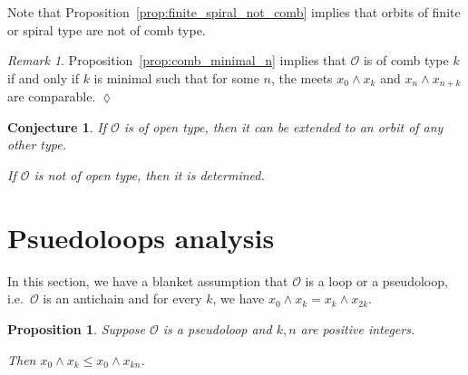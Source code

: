 \documentclass[final,a4paper,12pt,reqno]{amsart}
\newcommand{\meet}{\mathop{\wedge}}
\newtheorem{conj}[thm]{Conjecture}
\newtheorem{prop}[thm]{Proposition}
\theoremstyle{remark}
\newtheorem{rem}[thm]{Remark}
\theoremstyle{definition}
\newcommand{\xqed}[1]{%
	\leavevmode\unskip\penalty9999 \hbox{}\nobreak\hfill
	\quad\hbox{\ensuremath{#1}}}
\let \leq \leqslant
\begin{document}
	
	Note that Proposition~\ref{prop:finite_spiral_not_comb} implies that orbits of finite or spiral type are not of comb type.
	
	\begin{rem}
		Proposition~\ref{prop:comb_minimal_n} implies that $\mathcal O$ is of comb type $k$ if and only if $k$ is minimal such that for some $n$, the meets $x_0\meet x_k$ and $x_{n}\meet x_{n+k}$ are comparable.\xqed{\lozenge}
	\end{rem}
	
	\begin{conj}
		If $\mathcal O$ is of open type, then it can be extended to an orbit of any other type.
		
		If $\mathcal O$ is not of open type, then it is determined.
	\end{conj}
	
	\section{Psuedoloops analysis}
	In this section, we have a blanket assumption that $\mathcal O$ is a loop or a pseudoloop, i.e.\ $\mathcal O$ is an antichain and for every $k$, we have $x_0\meet x_k=x_k\meet x_{2k}$.
	\begin{prop}
		Suppose $\mathcal O$ is a pseudoloop and $k,n$ are positive integers.
		
		Then $x_0\meet x_k\leq x_0\meet x_{kn}$.
	\end{prop}
\end{document}
